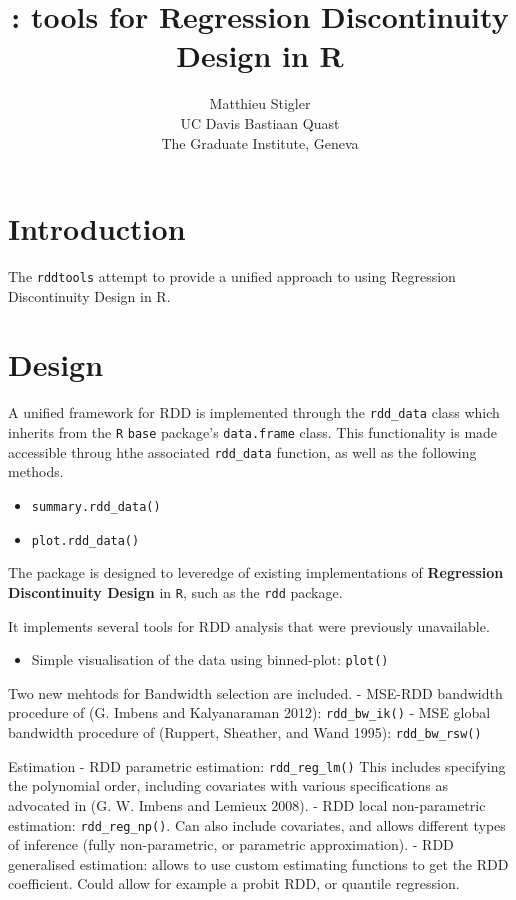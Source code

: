 \documentclass[article]{jss}
\author{
Matthieu Stigler\\UC Davis \And Bastiaan Quast\\The Graduate Institute, Geneva
}
\title{\pkg{rddtools}: tools for Regression Discontinuity Design in R}
\begin{document}
\section{Introduction}\label{introduction}

The \texttt{rddtools} attempt to provide a unified approach to using
Regression Discontinuity Design in R.

\section{Design}\label{design}

A unified framework for RDD is implemented through the
\texttt{rdd\_data} class which inherits from the \texttt{R}
\texttt{base} package's \texttt{data.frame} class. This functionality is
made accessible throug hthe associated \texttt{rdd\_data} function, as
well as the following methods.

\begin{itemize}
\itemsep1pt\parskip0pt
\item
  \texttt{summary.rdd\_data()}
\item
  \texttt{plot.rdd\_data()}
\end{itemize}

The package is designed to leveredge of existing implementations of
\textbf{Regression Discontinuity Design} in \texttt{R}, such as the
\texttt{rdd} package.

It implements several tools for RDD analysis that were previously
unavailable.

\begin{itemize}
\itemsep1pt\parskip0pt
\item
  Simple visualisation of the data using binned-plot: \texttt{plot()}
\end{itemize}

Two new mehtods for Bandwidth selection are included. - MSE-RDD
bandwidth procedure of (G. Imbens and Kalyanaraman 2012):
\texttt{rdd\_bw\_ik()} - MSE global bandwidth procedure of (Ruppert,
Sheather, and Wand 1995): \texttt{rdd\_bw\_rsw()}

Estimation - RDD parametric estimation: \texttt{rdd\_reg\_lm()} This
includes specifying the polynomial order, including covariates with
various specifications as advocated in (G. W. Imbens and Lemieux 2008).
- RDD local non-parametric estimation: \texttt{rdd\_reg\_np()}. Can also
include covariates, and allows different types of inference (fully
non-parametric, or parametric approximation). - RDD generalised
estimation: allows to use custom estimating functions to get the RDD
coefficient. Could allow for example a probit RDD, or quantile
regression.
\end{document}

